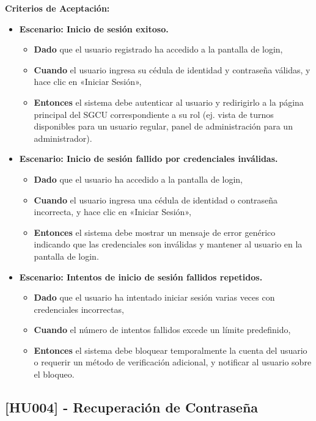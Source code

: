 \documentclass[12pt]{article}
\begin{document}
\textbf{Criterios de Aceptación:}
\begin{itemize}
	\item \textbf{Escenario: Inicio de sesión exitoso.}
	\begin{itemize}
		\item \textbf{Dado} que el usuario registrado ha accedido a la pantalla de login,
		\item \textbf{Cuando} el usuario ingresa su cédula de identidad y contraseña válidas, y hace clic en «Iniciar Sesión»,
		\item \textbf{Entonces} el sistema debe autenticar al usuario y redirigirlo a la página principal del SGCU correspondiente a su rol (ej. vista de turnos disponibles para un usuario regular, panel de administración para un administrador).
	\end{itemize}

	\item \textbf{Escenario: Inicio de sesión fallido por credenciales inválidas.}
	\begin{itemize}
		\item \textbf{Dado} que el usuario ha accedido a la pantalla de login,
		\item \textbf{Cuando} el usuario ingresa una cédula de identidad o contraseña incorrecta, y hace clic en «Iniciar Sesión»,
		\item \textbf{Entonces} el sistema debe mostrar un mensaje de error genérico indicando que las credenciales son inválidas y mantener al usuario en la pantalla de login.
	\end{itemize}

	\item \textbf{Escenario: Intentos de inicio de sesión fallidos repetidos.}
	\begin{itemize}
		\item \textbf{Dado} que el usuario ha intentado iniciar sesión varias veces con credenciales incorrectas,
		\item \textbf{Cuando} el número de intentos fallidos excede un límite predefinido,
		\item \textbf{Entonces} el sistema debe bloquear temporalmente la cuenta del usuario o requerir un método de verificación adicional, y notificar al usuario sobre el bloqueo.
	\end{itemize}
\end{itemize}

\pagebreak

\subsection{[HU004] - Recuperación de Contraseña}
\end{document}
